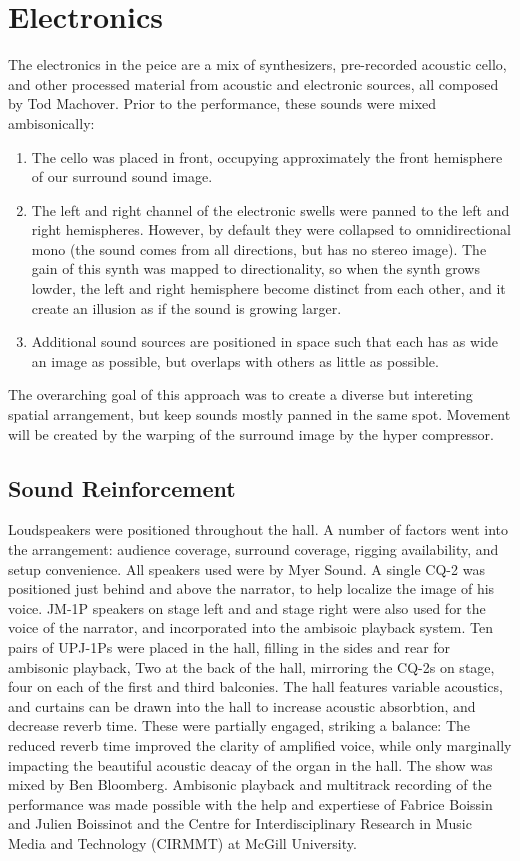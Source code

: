 \section{Electronics}
\label{sec:electronics}
The electronics in the peice are a mix of synthesizers, pre-recorded
acoustic cello, and other processed material from acoustic and
electronic sources, all composed by Tod Machover. Prior to the
performance, these sounds were mixed ambisonically:
\begin{enumerate}
\item The cello was placed in front, occupying approximately the front
  hemisphere of our surround sound image.
\item The left and right channel of the electronic swells were panned
  to the left and right hemispheres. However, by default they were
  collapsed to omnidirectional mono (the sound comes from all
  directions, but has no stereo image). The gain of this synth was
  mapped to directionality, so when the synth grows lowder, the left
  and right hemisphere become distinct from each other, and it create
  an illusion as if the sound is growing larger.
\item Additional sound sources are positioned in space such that each
  has as wide an image as possible, but overlaps with others as little
  as possible.
\end{enumerate}
The overarching goal of this approach was to create a diverse but
intereting spatial arrangement, but keep sounds mostly panned in the
same spot. Movement will be created by the warping of the surround
image by the hyper compressor.

\subsection{Sound Reinforcement}
\label{sec:sound-reinforcement}
Loudspeakers were positioned throughout the hall. A number of factors
went into the arrangement: audience coverage, surround coverage,
rigging availability, and setup convenience. All speakers used were by
Myer Sound. A single CQ-2
was positioned just behind and above the narrator, to help localize
the image of his voice.  JM-1P speakers on stage left and and stage
right were also used for the voice of the narrator, and incorporated
into the ambisoic playback system. Ten pairs of UPJ-1Ps were placed in
the hall, filling in the sides and rear for ambisonic playback, Two at
the back of the hall, mirroring the CQ-2s on stage, four on each of
the first and third balconies.  The hall features variable acoustics,
and curtains can be drawn into the hall to increase acoustic
absorbtion, and decrease reverb time. These were partially engaged,
striking a balance: The reduced reverb time improved the clarity of
amplified voice, while only marginally impacting the beautiful
acoustic deacay of the organ in the hall. The show was mixed by Ben
Bloomberg. Ambisonic playback and multitrack recording of the
performance was made possible with the help and expertiese of Fabrice
Boissin and Julien Boissinot and the Centre for Interdisciplinary
Research in Music Media and Technology (CIRMMT) at McGill University.

